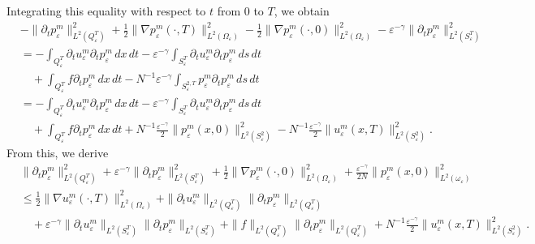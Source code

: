 \documentclass[10pt,a4paper]{amsart}
\numberwithin{equation}{section}
\begin{document}
Integrating this equality with respect to $t$ from $0$ to $T$, we obtain
\begin{align*}
&-\| \partial _{t}p_{\varepsilon }^m\| _{L^2(Q_{\varepsilon
 }^{T})}^2+\frac{1}{2}\| \nabla p_{\varepsilon }^m(\cdot ,T)\|
 _{L^2(\Omega _{\varepsilon })}^2-\frac{1}{2}\| \nabla p_{\varepsilon
 }^m(\cdot ,0)\| _{L^2(\Omega _{\varepsilon })}^2-\varepsilon
 ^{-\gamma }\| \partial _{t}p_{\varepsilon }^m\|
_{L^2(S_{\varepsilon }^{T})}^2 \\
&=-\int _{Q_{\varepsilon }^{T}}\partial _{t}u_{\varepsilon
 }^m\partial _{t}p_{\varepsilon }^m\,dx\,dt-\varepsilon ^{-\gamma }\int
 _{S_{\varepsilon }^{T}}\partial _{t}u_{\varepsilon }^m\partial
 _{t}p_{\varepsilon }^m\,ds\,dt \\
&\quad +\int _{Q_{\varepsilon }^{T}}f\partial _{t}p_{\varepsilon }^m\,dx\,dt
 -N^{-1}\varepsilon ^{-\gamma }\int _{S_{\varepsilon
 }^{2,T}}p_{\varepsilon }^m\partial _{t}p_{\varepsilon }^m\,ds\,dt \\
&=-\int _{Q_{\varepsilon }^{T}}\partial _{t}u_{\varepsilon
 }^m\partial _{t}p_{\varepsilon }^m\,dx\,dt-\varepsilon ^{-\gamma }\int
 _{S_{\varepsilon }^{T}}\partial _{t}u_{\varepsilon }^m\partial
 _{t}p_{\varepsilon }^m\,ds\,dt \\
&\quad +\int _{Q_{\varepsilon }^{T}}f\partial _{t}p_{\varepsilon }^m\,dx\,dt
 +N^{-1}\frac{\varepsilon ^{-\gamma }}{2}\| p_{\varepsilon }^m(x,0)\|
 _{L^2(S_{\varepsilon }^2)}^2-N^{-1}\frac{\varepsilon ^{-\gamma }}{2}%
 \| u_{\varepsilon }^m(x,T)\| _{L^2(S_{\varepsilon }^2)}^2.
\end{align*}
From this, we derive
\begin{align*}
&\| \partial _{t}p_{\varepsilon }^m\| _{L^2(Q_{\varepsilon
 }^{T})}^2+\varepsilon ^{-\gamma }\| \partial _{t}p_{\varepsilon
 }^m\| _{L^2(S_{\varepsilon }^{T})}^2+\frac{1}{2}\| \nabla
 p_{\varepsilon }^m(\cdot ,0)\| _{L^2(\Omega _{\varepsilon })}^2+%
 \frac{\varepsilon ^{-\gamma }}{2N}\| p_{\varepsilon }^m(x,0)\|
 _{L^2(\omega _{\varepsilon })}^2 \\
&\leq \frac{1}{2}\| \nabla u_{\varepsilon }^m(\cdot ,T)\|
 _{L^2(\Omega _{\varepsilon })}^2+\| \partial _{t}u_{\varepsilon
 }^m\| _{L^2(Q_{\varepsilon }^{T})}\| \partial _{t}p_{\varepsilon
 }^m\| _{L^2(Q_{\varepsilon }^{T})} \\
&\quad +\varepsilon ^{-\gamma }\| \partial _{t}u_{\varepsilon }^m\|
 _{L^2(S_{\varepsilon }^{T})}\| \partial _{t}p_{\varepsilon }^m\|
 _{L^2(S_{\varepsilon }^{T})}+\| f\| _{L^2(Q_{\varepsilon
 }^{T})}\| \partial _{t}p_{\varepsilon }^m\| _{L^2(Q_{\varepsilon
 }^{T})} + N^{-1}\frac{\varepsilon^{-\gamma}}{2}\| u^m_\varepsilon(x, T)\|^2_{L^2(S^2_\varepsilon)}.
\end{align*}
\end{document}
